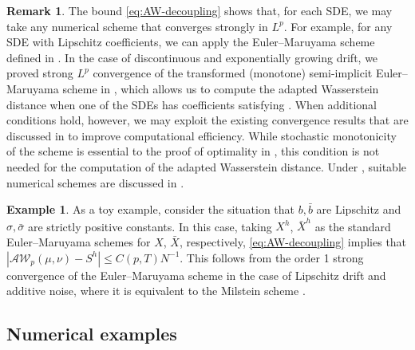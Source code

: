 \documentclass[onseside, final]{amsart}
\theoremstyle{definition}
\newtheorem{example}[theorem]{Example}
\newtheorem{remark}[theorem]{Remark}
\newcommand{\AW}{\mathcal A\mathcal W}
\numberwithin{equation}{section}
\begin{document}
		\begin{remark} \label{rem:no-mon-needed}
			The bound \eqref{eq:AW-decoupling} shows that, for each SDE, we may take any numerical scheme that converges strongly in $L^p$. For example, for any SDE with Lipschitz coefficients, we can apply the Euler--Maruyama scheme defined in .
			In the case of discontinuous and exponentially growing drift, we proved strong $L^p$ convergence of the transformed (monotone) semi-implicit Euler--Maruyama scheme in , which allows us to compute the adapted Wasserstein distance when one of the SDEs has coefficients satisfying . When additional conditions hold, however, we may exploit the existing convergence results that are discussed in  to improve computational efficiency. While stochastic monotonicity of the scheme is essential to the proof of optimality in , this condition is not needed for the computation of the adapted Wasserstein distance. Under , suitable numerical schemes are discussed in .
		\end{remark}
		
		\begin{example}
			As a toy example, consider the situation that $b, \bar b$ are Lipschitz and $\sigma, \bar \sigma$ are strictly positive constants. In this case, taking $X^h$, $\bar X^h$ as the standard Euler--Maruyama schemes for $X$, $\bar X$, respectively, \eqref{eq:AW-decoupling} implies that $|\AW_p(\mu, \nu) - S^h| \leq C(p, T) N^{-1}$. This follows from the order 1 strong convergence of the Euler--Maruyama scheme in the case of Lipschitz drift and additive noise, where it is equivalent to the Milstein scheme \cite{Mi75}.
		\end{example}
				
	\subsection{Numerical examples}\label{sec:examples}
	
\end{document}
